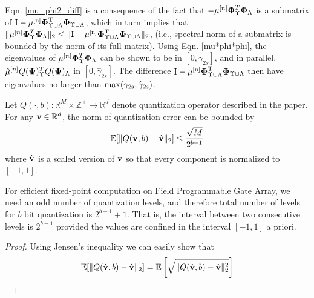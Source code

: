 \documentclass[aoas,preprint]{imsart}
\numberwithin{equation}{section}
\theoremstyle{plain}
\begin{document}
{Eqn. \ref{mu_phi2_diff} is a consequence of the fact that $-\mu^{[n]}\boldsymbol{{\bf \Phi}}_{\Upsilon}^T\boldsymbol{{\bf \Phi}}_{\Lambda}$ is a submatrix of $\rm{I}-\mu^{[n]}\boldsymbol{{\bf \Phi}}_{\Upsilon \cup \Lambda}^T\boldsymbol{{\bf \Phi}}_{\Upsilon \cup \Lambda}$, which in turn implies that $\|\mu^{[n]}\boldsymbol{{\bf \Phi}}_{\Upsilon}^T\boldsymbol{{\bf \Phi}}_{\Lambda}\|_2 \leq \|\rm{I}-\mu^{[n]}\boldsymbol{{\bf \Phi}}_{\Upsilon \cup \Lambda}^T\boldsymbol{{\bf \Phi}}_{\Upsilon \cup \Lambda} \|_2$, (i.e., spectral norm of a submatrix is bounded by the norm of its full matrix). Using Eqn. \ref{mu*phi*phi}, the eigenvalues of $\mu^{[n]}\boldsymbol{{\bf \Phi}}_{\Upsilon}^T\boldsymbol{{\bf \Phi}}_{\Lambda}$ can be shown to be in $[0, \gamma_{2s}]$, and in parallel, $\hat{\mu}^{[n]}Q(\boldsymbol{{\bf \Phi}})_{\Upsilon}^TQ(\boldsymbol{{\bf \Phi}})_{\Lambda}$ in $[0, \hat{\gamma}_{2s}]$. The difference $\rm{I}-\mu^{[n]}\boldsymbol{{\bf \Phi}}_{\Upsilon \cup \Lambda}^T\boldsymbol{{\bf \Phi}}_{\Upsilon \cup \Lambda}$ then have eigenvalues no larger than $\rm{max}(\gamma_{2s}, \hat{\gamma}_{2s})$.
\begin{lemma}\label{lemma_on_quantized_vector}
Let $Q(\cdot, b): \mathbb{R}^M\times \mathbb{Z}^+ \rightarrow \mathbb{R}^d$ denote quantization operator described in the paper. For any ${\bf v}\in \mathbb{R}^d$, the norm of quantization error can be bounded by
\begin{equation}\label{quantization_error}
    \mathbb{E}[\| Q({\bf v}, b) - \hat{\bf v}\|_2] \leq \frac{\sqrt{M}}{2^{b-1}}
\end{equation}
where $\hat{\bf v}$ is a scaled version of ${\bf v}$ so that every component is normalized to $[-1, 1]$.
\end{lemma}
\begin{remark}
For efficient fixed-point computation on Field Programmable Gate Array, we need an odd number of quantization levels, and therefore total number of levels for $b$ bit quantization is $2^{b-1}+1$. That is, the interval between two consecutive levels is $2^{b-1}$ provided the values are confined in the interval $[-1, 1]$ a priori.
\end{remark}
\begin{proof}
Using Jensen's inequality we can easily show that
\begin{equation}\label{quantization_error_bound1}
\begin{split}
    \mathbb{E}[\| Q(\hat{\bf v}, b) - \hat{\bf v}\|_2] &= \mathbb{E}\left[\sqrt{\| Q(\hat{\bf v}, b) - \hat{\bf v}\|^2_2} \right]\\

\end{split}
\end{equation}
\end{proof}}
\end{document}

